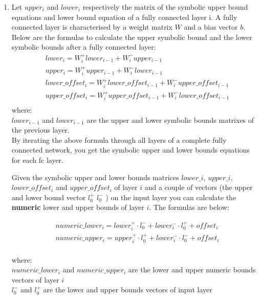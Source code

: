 \begin{enumerate}
    \item
    Let $upper_i$ and $lower_i$ respectively the matrix of the symbolic upper bound equations and lower bound equation of a fully connected layer i.
    A fully connected layer is characterised by a weight matrix $W$ and a bias vector $b$.\\
    Below are the formulas to calculate the upper symbolic bound and the lower symbolic bounds after a fully connected layer:
    \begin{equation}
        \begin{aligned}
            &lower_i = W^+_i lower_{i-1} + W^-_i upper_{i-1}\\
            &upper_i = W^+_i upper_{i-1} + W^-_i lower_{i-1}\\
            &lower\_offset_i = W^+_i lower\_offset_{i-1} + W^-_i upper\_offset_{i-1}\\
            &upper\_offset_i = W^+_i upper\_offset_{i-1} + W^-_i lower\_offset_{i-1}\\
        \end{aligned}
    \end{equation}
    where:\\
    $lower_{i-1}$ and $lower_{i-1}$ are the upper and lower symbolic bounds 
    matrixes of the previous layer. \\

    By iterating the above formula through all layers of a complete fully connected network, you get the symbolic upper and lower bounds equations for each fc layer.

    Given the symbolic upper and lower bounds matrices $lower\_i$, $upper\_i$, $lower\_offset_i$ and $upper\_offset_i$ of layer $i$ and a couple of vectors (the upper and lower bound vector $l^{+}_0$ $l^{-}_0$ ) on the input layer you can calculate the \textbf{numeric} lower and upper bounds of layer $i$. The formulas are below:
    
     \begin{equation}
        \begin{aligned}
            &numeric\_lower_i = lower_{i}^{+} \cdot l^{-}_0 + lower_{i}^{-} \cdot l^{+}_0 + offset_i\\
            &numeric\_upper_i = upper_{i}^{+} \cdot l^{+}_0 + lower_{i}^{-} \cdot l^{-}_0 + offset_i\\
        \end{aligned}
    \end{equation}

    where: \\
     $numeric\_lower_i$ and $numeric\_upper_i$ are the lower and upper numeric bounds vectors of layer $i$\\
     $l^{-}_0$ and $l^{+}_0$ are the lower and upper bounds vectors of input layer\\
\end{enumerate}

